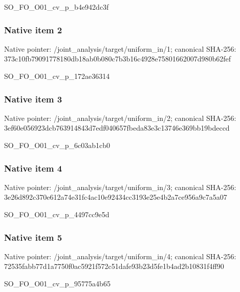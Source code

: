 \documentclass[10pt,a4paper]{article}
\begin{document}
\begingroup\raggedright\sloppy SO\_\allowbreak{}FO\_\allowbreak{}O01\_\allowbreak{}cv\_\allowbreak{}p\_\allowbreak{}b4e942dc3f\par\endgroup

\subsubsection{Native item 2}
Native pointer: /joint\_\allowbreak{}analysis/target/uniform\_\allowbreak{}in/1; canonical SHA-256: 373c10fb79091778180db18ab0b080c7b3b16c4928e75801662007d980b62fef

\begingroup\raggedright\sloppy SO\_\allowbreak{}FO\_\allowbreak{}O01\_\allowbreak{}cv\_\allowbreak{}p\_\allowbreak{}172ae36314\par\endgroup

\subsubsection{Native item 3}
Native pointer: /joint\_\allowbreak{}analysis/target/uniform\_\allowbreak{}in/2; canonical SHA-256: 3ef60e056923dcb763914843d7edf040657fbeda83e3c13746e369bb19bdeccd

\begingroup\raggedright\sloppy SO\_\allowbreak{}FO\_\allowbreak{}O01\_\allowbreak{}cv\_\allowbreak{}p\_\allowbreak{}6c03ab1cb0\par\endgroup

\subsubsection{Native item 4}
Native pointer: /joint\_\allowbreak{}analysis/target/uniform\_\allowbreak{}in/3; canonical SHA-256: 3e26d892c370e612a74e31fc4ac10e92434cc3193e25e4b2a7ce956a9c7a5a07

\begingroup\raggedright\sloppy SO\_\allowbreak{}FO\_\allowbreak{}O01\_\allowbreak{}cv\_\allowbreak{}p\_\allowbreak{}4497cc9e5d\par\endgroup

\subsubsection{Native item 5}
Native pointer: /joint\_\allowbreak{}analysis/target/uniform\_\allowbreak{}in/4; canonical SHA-256: 72535fabb77d1a7750f0ac5921f572c51dafe93b23d5fe1b4ad2b10831f4ff90

\begingroup\raggedright\sloppy SO\_\allowbreak{}FO\_\allowbreak{}O01\_\allowbreak{}cv\_\allowbreak{}p\_\allowbreak{}95775a4b65\par\endgroup
\end{document}
